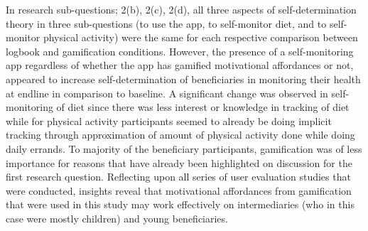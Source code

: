 In research sub-questions; 2(b), 2(c), 2(d), all three aspects of self-determination theory in three sub-questions (to use the app, to self-monitor diet, and to self-monitor physical activity) were the same for each respective comparison between logbook and gamification conditions. However, the presence of a self-monitoring app regardless of whether the app has gamified motivational affordances or not, appeared to increase self-determination of beneficiaries in monitoring their health at endline in comparison to baseline. A significant change was observed in self-monitoring of diet since there was less interest or knowledge in tracking of diet while for physical activity participants seemed to already be doing implicit tracking through approximation of amount of physical activity done while doing daily errands. To majority of the beneficiary participants, gamification was of less importance for reasons that have already been highlighted on discussion for the first research question. Reflecting upon all series of user evaluation studies that were conducted, insights reveal that motivational affordances from gamification that were used in this study may work effectively on intermediaries (who in this case were mostly children) and young beneficiaries. 

